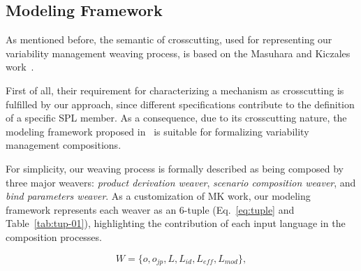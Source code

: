 \documentclass{acm_proc_article-sp}
\begin{document}
% 




\subsection{Modeling Framework}\label{sub:modeling-framework}

As mentioned before, the semantic of crosscutting, used for representing our variability management weaving process, is based on the Masuhara and Kiczales work~\cite{kiczales-ecoop-2003}. 

First of all, their requirement for characterizing a mechanism as crosscutting is fulfilled by our approach, since different specifications contribute to the definition of a specific SPL member. As a consequence, due to its crosscutting nature, the modeling framework proposed in~\cite{kiczales-ecoop-2003}  is suitable for formalizing variability management compositions. 

For simplicity, our weaving process is formally described as being composed by three major weavers: \emph{product derivation weaver}, \emph{scenario composition weaver}, and \emph{bind parameters weaver}. As a customization of MK work, our modeling framework represents each weaver as an 6-tuple (Eq.~\ref{eq:tuple} and Table~\ref{tab:tup-01}), highlighting the contribution of each input language in the composition processes. 

\begin{equation}
W = \{o, o_{jp}, L, L_{id}, L_{eff}, L_{mod}\}, 
\label{eq:tuple}
\end{equation}
\end{document}
